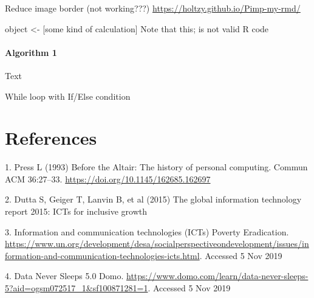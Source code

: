 \documentclass[11pt,]{article}
\newenvironment{Shaded}{\begin{snugshade}}{\end{snugshade}}
\newcommand{\NormalTok}[1]{\textcolor[rgb]{0.12,0.11,0.11}{#1}}
\newcommand{\StringTok}[1]{\textcolor[rgb]{0.75,0.01,0.01}{#1}}
\let\oldparagraph\paragraph
\renewcommand{\paragraph}[1]{\oldparagraph{#1}\mbox{}}
\begin{document}
Reduce image border (not working???)
\url{https://holtzy.github.io/Pimp-my-rmd/}

\begin{Shaded}
\begin{Highlighting}[]
\NormalTok{object <-}\StringTok{ }\NormalTok{[some kind of calculation]}
\NormalTok{Note that this; is not valid R code}
\end{Highlighting}
\end{Shaded}

\hypertarget{algorithm-1-2}{%
\paragraph{Algorithm 1}\label{algorithm-1-2}}

Text

\begin{algorithm}[H]
\DontPrintSemicolon
\SetAlgoLined
{}
\BlankLine
{}
\caption{While loop with If/Else condition}
\end{algorithm}

\hypertarget{references}{%
\section*{References}\label{references}}

\hypertarget{refs}{}
\leavevmode\hypertarget{ref-pressAltairHistoryPersonal1993}{}%
1. Press L (1993) Before the Altair: The history of personal computing.
Commun ACM 36:27--33. \url{https://doi.org/10.1145/162685.162697}

\leavevmode\hypertarget{ref-duttaGlobalInformationTechnology2015}{}%
2. Dutta S, Geiger T, Lanvin B, et al (2015) The global information
technology report 2015: ICTs for inclusive growth

\leavevmode\hypertarget{ref-InformationCommunicationTechnologies}{}%
3. Information and communication technologies (ICTs) \textbar{} Poverty
Eradication.
\url{https://www.un.org/development/desa/socialperspectiveondevelopment/issues/information-and-communication-technologies-icts.html}.
Accessed 5 Nov 2019

\leavevmode\hypertarget{ref-DataNeverSleeps}{}%
4. Data Never Sleeps 5.0 \textbar{} Domo.
\url{https://www.domo.com/learn/data-never-sleeps-5?aid=ogsm072517_1\&sf100871281=1}.
Accessed 5 Nov 2019
\end{document}
